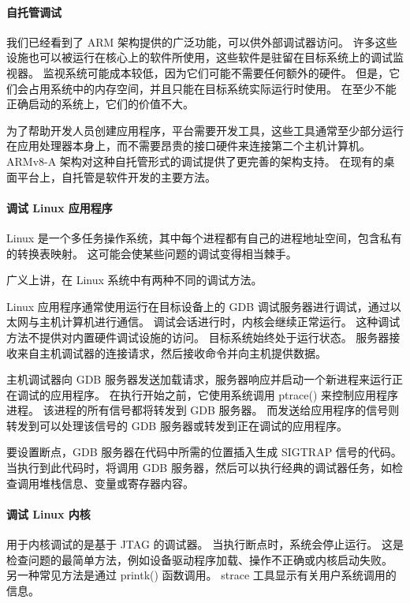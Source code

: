 \paragraph*{自托管调试}

我们已经看到了 ARM 架构提供的广泛功能，可以供外部调试器访问。
许多这些设施也可以被运行在核心上的软件所使用，这些软件是驻留在目标系统上的调试监视器。
监视系统可能成本较低，因为它们可能不需要任何额外的硬件。
但是，它们会占用系统中的内存空间，并且只能在目标系统实际运行时使用。
在至少不能正确启动的系统上，它们的价值不大。

为了帮助开发人员创建应用程序，平台需要开发工具，这些工具通常至少部分运行在应用处理器本身上，而不需要昂贵的接口硬件来连接第二个主机计算机。
ARMv8-A 架构对这种自托管形式的调试提供了更完善的架构支持。
在现有的桌面平台上，自托管是软件开发的主要方法。

\paragraph*{调试 Linux 应用程序}

Linux 是一个多任务操作系统，其中每个进程都有自己的进程地址空间，包含私有的转换表映射。
这可能会使某些问题的调试变得相当棘手。

广义上讲，在 Linux 系统中有两种不同的调试方法。

Linux 应用程序通常使用运行在目标设备上的 GDB 调试服务器进行调试，通过以太网与主机计算机进行通信。
调试会话进行时，内核会继续正常运行。
这种调试方法不提供对内置硬件调试设施的访问。
目标系统始终处于运行状态。
服务器接收来自主机调试器的连接请求，然后接收命令并向主机提供数据。

主机调试器向 GDB 服务器发送加载请求，服务器响应并启动一个新进程来运行正在调试的应用程序。
在执行开始之前，它使用系统调用 ptrace() 来控制应用程序进程。
该进程的所有信号都将转发到 GDB 服务器。
而发送给应用程序的信号则转发到可以处理该信号的 GDB 服务器或转发到正在调试的应用程序。

要设置断点，GDB 服务器在代码中所需的位置插入生成 SIGTRAP 信号的代码。
当执行到此代码时，将调用 GDB 服务器，然后可以执行经典的调试器任务，如检查调用堆栈信息、变量或寄存器内容。

\paragraph*{调试 Linux 内核}

用于内核调试的是基于 JTAG 的调试器。
当执行断点时，系统会停止运行。
这是检查问题的最简单方法，例如设备驱动程序加载、操作不正确或内核启动失败。
另一种常见方法是通过 printk() 函数调用。
strace 工具显示有关用户系统调用的信息。

